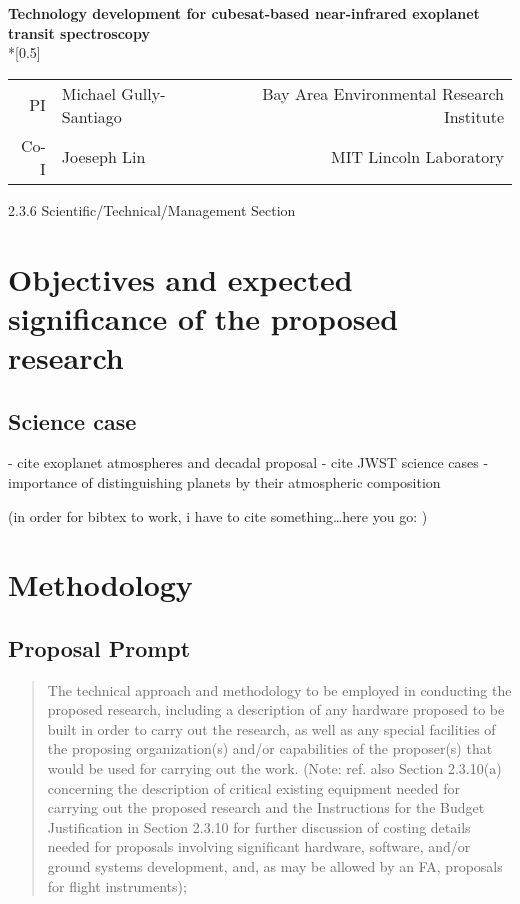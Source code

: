 \documentclass[12pt]{article}
\makeatletter
\renewcommand*{\maketitle}{
\begin{center}
  \begingroup
  \Large
  \textbf{Technology development for cubesat-based near-infrared exoplanet transit spectroscopy} \\*[0.5\baselineskip]
  \normalsize
\begin{tabular}{r@{:\quad}lr}
          PI & Michael Gully-Santiago       & Bay Area Environmental Research Institute       \\
        Co-I & Joeseph Lin & MIT Lincoln Laboratory
\end{tabular}
  \endgroup
\end{center}
}
\makeatother
\begin{document}

\cleardoublepage
\setcounter{page}{1}


\maketitle

2.3.6 Scientific/Technical/Management Section

\section{Objectives and expected significance of the proposed research}

\subsection{Science case}
- cite exoplanet atmospheres and decadal proposal
- cite JWST science cases
- importance of distinguishing planets by their atmospheric composition

(in order for bibtex to work, i have to cite something\ldots here you
go: \citealt{Einstein1936})


\section{Methodology}
\label{sec:method}
\subsection{Proposal Prompt}

\begin{quote}
The technical approach and methodology to be employed in conducting
the proposed research, including a description of any hardware
proposed to be built in order to carry out the research, as well as
any special facilities of the proposing organization(s) and/or
capabilities of the proposer(s) that would be used for carrying out
the work. (Note: ref. also Section 2.3.10(a) concerning the
description of critical existing equipment needed for carrying out the
proposed research and the Instructions for the Budget Justification in
Section 2.3.10 for further discussion of costing details needed for
proposals involving significant hardware, software, and/or ground
systems development, and, as may be allowed by an FA, proposals for
flight instruments);
\end{quote}
\end{document}
